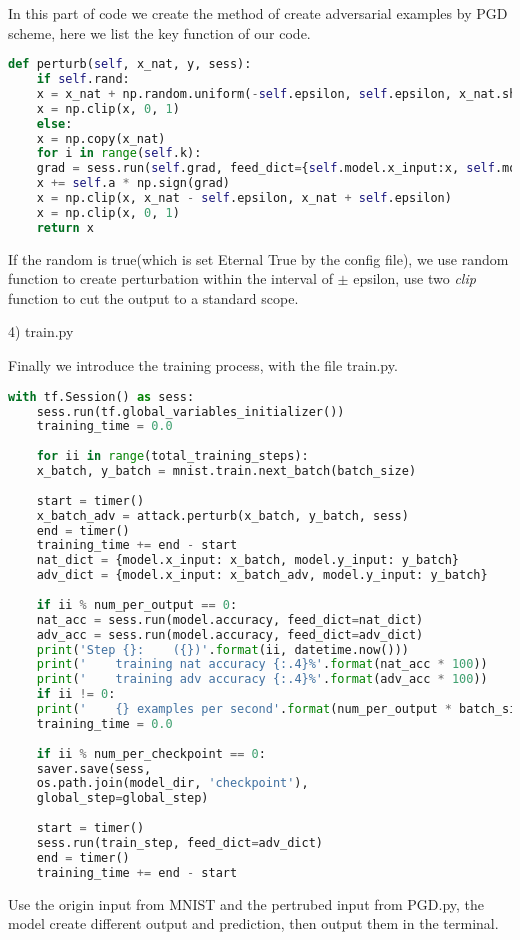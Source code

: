 \documentclass[
	letterpaper, %
	10pt, %
]{CSUniSchoolLabReport}
\begin{document}
In this part of code we create the method of create adversarial examples by PGD scheme, here we list the key function of our code.
\begin{lstlisting}[language=Python]
def perturb(self, x_nat, y, sess):
	if self.rand:
	x = x_nat + np.random.uniform(-self.epsilon, self.epsilon, x_nat.shape)
	x = np.clip(x, 0, 1)
	else:
	x = np.copy(x_nat)
	for i in range(self.k):
	grad = sess.run(self.grad, feed_dict={self.model.x_input:x, self.model.y_input:y})
	x += self.a * np.sign(grad)
	x = np.clip(x, x_nat - self.epsilon, x_nat + self.epsilon)
	x = np.clip(x, 0, 1)
	return x
\end{lstlisting}
If the random is true(which is set	Eternal True by the config file), we use random function to create perturbation within the interval of $\pm$ epsilon, use two \emph{clip} function to cut the output to a standard scope.

4) train.py

Finally we introduce the training process, with the file train.py.
\begin{lstlisting}[language=Python]
with tf.Session() as sess:
	sess.run(tf.global_variables_initializer())
	training_time = 0.0
	
	for ii in range(total_training_steps):
	x_batch, y_batch = mnist.train.next_batch(batch_size)
	
	start = timer()
	x_batch_adv = attack.perturb(x_batch, y_batch, sess)
	end = timer()
	training_time += end - start
	nat_dict = {model.x_input: x_batch, model.y_input: y_batch}
	adv_dict = {model.x_input: x_batch_adv, model.y_input: y_batch}
	
	if ii % num_per_output == 0:
	nat_acc = sess.run(model.accuracy, feed_dict=nat_dict)
	adv_acc = sess.run(model.accuracy, feed_dict=adv_dict)
	print('Step {}:    ({})'.format(ii, datetime.now()))
	print('    training nat accuracy {:.4}%'.format(nat_acc * 100))
	print('    training adv accuracy {:.4}%'.format(adv_acc * 100))
	if ii != 0:
	print('    {} examples per second'.format(num_per_output * batch_size / training_time))
	training_time = 0.0
	
	if ii % num_per_checkpoint == 0:
	saver.save(sess,
	os.path.join(model_dir, 'checkpoint'),
	global_step=global_step)
	
	start = timer()
	sess.run(train_step, feed_dict=adv_dict)
	end = timer()
	training_time += end - start
\end{lstlisting}
Use the origin input from MNIST and the pertrubed input from PGD.py, the model create different output and prediction, then output them in the terminal.
\end{document}
